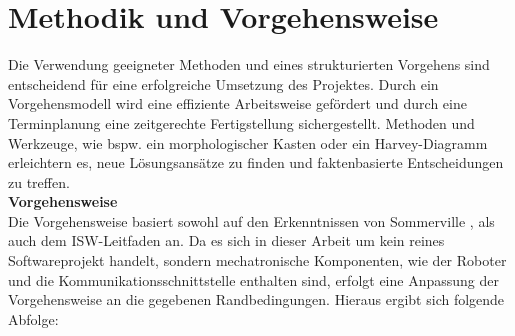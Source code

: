 \documentclass[ a4paper,
                oneside,
                toc=bibliography,
                toc=listof
                ]{scrbook}
\begin{document}
	\section{Methodik und Vorgehensweise}
	Die Verwendung geeigneter Methoden und eines strukturierten Vorgehens sind entscheidend für eine erfolgreiche Umsetzung des Projektes. Durch ein Vorgehensmodell wird eine effiziente Arbeitsweise gefördert und durch eine Terminplanung eine zeitgerechte Fertigstellung sichergestellt. Methoden und Werkzeuge, wie bspw. ein morphologischer Kasten oder ein Harvey-Diagramm erleichtern es, neue Lösungsansätze zu finden und faktenbasierte Entscheidungen zu treffen. \cite{SoftwaretechnikBroy} \cite{ISWLeitfaden} \vspace{0.5\baselineskip}\\
	\textbf{Vorgehensweise}\\
	Die Vorgehensweise basiert sowohl auf den Erkenntnissen von Sommerville \cite{Sommerville}, als auch dem ISW-Leitfaden \cite{ISWLeitfaden} an. Da es sich in dieser Arbeit um kein reines Softwareprojekt handelt, sondern mechatronische Komponenten, wie der Roboter und die Kommunikationsschnittstelle enthalten sind, erfolgt eine Anpassung der Vorgehensweise an die gegebenen Randbedingungen. Hieraus ergibt sich folgende Abfolge:\\
\end{document}
